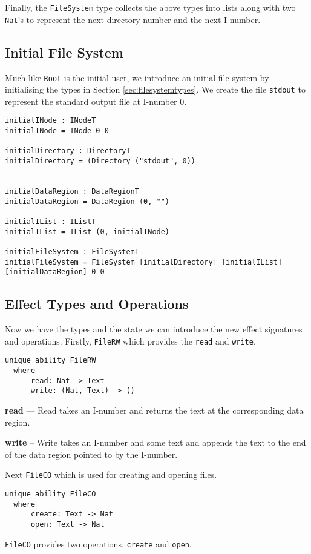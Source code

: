 \documentclass[logo,bsc,singlespacing,parskip]{infthesis}
\begin{document}
Finally, the \texttt{FileSystem} type collects the above types into lists along with two \texttt{Nat}'s to represent the next directory number and the next I-number.

\subsection{Initial File System}

Much like \texttt{Root} is the initial user, we introduce an initial file
system by initialising the types in Section \ref{sec:filesystemtypes}. We
create the file \texttt{stdout} to represent the standard output file at
I-number 0.

\begin{lstlisting}[language=unison]
initialINode : INodeT
initialINode = INode 0 0

initialDirectory : DirectoryT
initialDirectory = (Directory ("stdout", 0))


initialDataRegion : DataRegionT
initialDataRegion = DataRegion (0, "")

initialIList : IListT
initialIList = IList (0, initialINode)

initialFileSystem : FileSystemT
initialFileSystem = FileSystem [initialDirectory] [initialIList] [initialDataRegion] 0 0
\end{lstlisting}

\subsection{Effect Types and Operations}

Now we have the types and the state we can introduce the new effect signatures
and operations. Firstly, \texttt{FileRW} which provides the \texttt{read} and
\texttt{write}.

\begin{lstlisting}[language=unison]
unique ability FileRW
  where
      read: Nat -> Text
      write: (Nat, Text) -> ()
\end{lstlisting}

\textbf{read} --- Read takes an I-number and returns the text at the corresponding data region.

\textbf{write} -- Write takes an I-number and some text and appends the text to
the end of the data region pointed to by the I-number.

Next \texttt{FileCO} which is used for creating and opening files.
\begin{lstlisting}[language=unison]
unique ability FileCO
  where
      create: Text -> Nat
      open: Text -> Nat
\end{lstlisting}
\texttt{FileCO} provides two operations, \texttt{create} and \texttt{open}.
\end{document}
